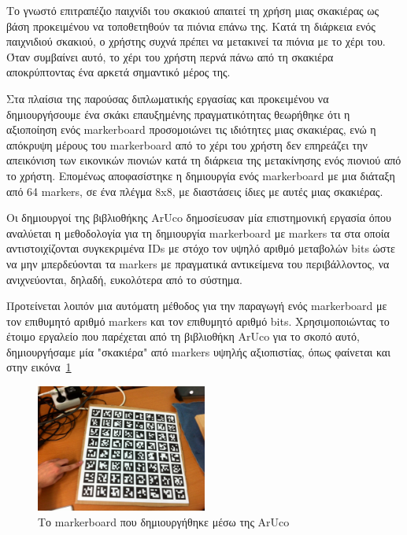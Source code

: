 Το γνωστό επιτραπέζιο παιχνίδι του σκακιού απαιτεί τη χρήση μιας σκακιέρας ως βάση προκειμένου να τοποθετηθούν τα πιόνια επάνω της. Kατά τη διάρκεια ενός παιχνιδιού σκακιού, ο χρήστης συχνά πρέπει να μετακινεί τα πιόνια με το χέρι του. Όταν συμβαίνει αυτό, το χέρι του χρήστη περνά πάνω από τη σκακιέρα αποκρύπτοντας ένα αρκετά σημαντικό μέρος της. 


Στα πλαίσια της παρούσας διπλωματικής εργασίας και προκειμένου να δημιουργήσουμε ένα σκάκι επαυξημένης πραγματικότητας θεωρήθηκε ότι η αξιοποίηση ενός markerboard προσομοιώνει τις ιδιότητες μιας σκακιέρας, ενώ η απόκρυψη μέρους του markerboard από το χέρι του χρήστη δεν επηρεάζει την απεικόνιση των εικονικών πιονιών κατά τη διάρκεια της μετακίνησης ενός πιονιού από το χρήστη. Επομένως αποφασίστηκε η δημιουργία ενός markerboard με μια διάταξη από 64 markers, σε ένα πλέγμα 8x8, με διαστάσεις ίδιες με αυτές μιας σκακιέρας. 


Οι δημιουργοί της βιβλιοθήκης ArUco δημοσίευσαν μία επιστημονική εργασία \cite{garrido2014automatic} όπου αναλύεται η μεθοδολογία για τη δημιουργία markerboard με markers τα στα οποία αντιστοιχίζονται συγκεκριμένα IDs με στόχο τον υψηλό αριθμό μεταβολών bits ώστε να μην μπερδεύονται τα markers με πραγματικά αντικείμενα του περιβάλλοντος, να ανιχνεύονται, δηλαδή, ευκολότερα από το σύστημα. 

Προτείνεται λοιπόν μια αυτόματη μέθοδος για την παραγωγή ενός markerboard με τον επιθυμητό αριθμό markers και τον επιθυμητό αριθμό bits. Χρησιμοποιώντας το έτοιμο εργαλείο που παρέχεται από τη βιβλιοθήκη ArUco για το σκοπό αυτό, δημιουργήσαμε μία "σκακιέρα" από markers υψηλής αξιοπιστίας, όπως φαίνεται και στην εικόνα~\ref{fig:markerboard}




\begin{figure}[H]
    \centering
    \includegraphics[width=0.5\textwidth]{Files/Figures/markerboard.pdf}
    \caption[Το markerboard που δημιουργήθηκε μέσω της ArUco]{Το markerboard που δημιουργήθηκε μέσω της ArUco}
    \label{fig:markerboard}
\end{figure}




